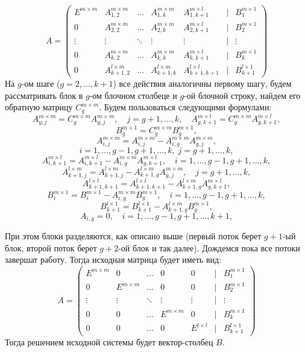 \documentclass[a4paper,12pt]{article}
\begin{document}
$$
    A=
   \begin{pmatrix}
     E^{m \times m} & A^{m \times m}_{1,2} &\ldots & A^{m \times m}_{1,k} & A^{m \times l}_{1,k+1} & \mid & B^{m \times 1}_1\\
     0 & A^{m \times m}_{2,2} &\ldots & A^{m \times m}_{2,k} & A^{m \times l}_{2,k+1} & \mid & B^{m \times 1}_2\\
     \vdots& \vdots &\ddots & \vdots & \vdots & \mid  & \vdots\\
    0 & A^{m \times m}_{k,2} &\ldots & A^{m \times m}_{k,k} & A^{m \times l}_{k,k+1} & \mid & B^{m \times 1}_k\\
     0 & A^{l \times m}_{k+1,2} & \ldots & A^{l \times m}_{k+1,k} & A^{l \times l}_{k+1,k+1} & \mid & B^{l \times 1}_{k+1}
    \end{pmatrix}
$$
На $g$-ом шаге ($g=2,\dots,k+1$) все действия аналогичны первому шагу, будем рассматривать блок в $g$-ом блочном столбеце и $g$-ой блочной строку, найдем его обратную матрицу $C^{m \times m}_g$. Будем пользоваться следующими формулами:
$$
    A^{m \times m}_{g,j} = C^{m \times m}_gA^{m \times m}_{g,j}, \quad j=g+1,\dots,k, \quad A^{m \times l}_{g, k+1} = C^{m \times m}_gA^{m \times l}_{g,k+1},
$$
$$
    B^{m \times 1}_g = C^{m \times m}_gB^{m \times 1}_g,
$$
$$
    A^{m \times m}_{i,j} = A^{m \times m}_{i,j} - A^{m \times m}_{i,g}A^{m \times m}_{g,j},
$$
$$
    i=1,\dots,g-1,g+1,\dots,k, \; j=g+1,\dots,k,
$$
$$
    A^{m \times l}_{i, k+1} = A^{m \times l}_{i, k+1} - A^{m \times m}_{i, g}A^{m \times l}_{g, k+1}, \quad i=1,\dots,g-1,g+1,\dots,k,
$$
$$
    A^{l \times m}_{k+1, j} = A^{l \times m}_{k+1, j} - A^{l \times m}_{k+1, g}A^{m \times m}_{g, j}, \quad j=g+1,\dots,k,
$$
$$
    A^{l \times l}_{k+1, k+1} = A^{l \times l}_{k+1, k+1} - A^{l \times m}_{k+1, g}A^{m \times l}_{g, k+1},
$$
$$
    B^{m \times 1}_i = B^{m \times 1}_i - A^{m \times m}_{i,g}B^{m \times 1}_g, \quad i=1,\dots,g-1,g+1,\dots,k,
$$
$$
    B^{l \times 1}_{k+1} = B^{l \times 1}_{k+1} - A^{l \times m}_{k+1, g}B^{m \times 1}_g,
$$
$$
    A_{i,g}=0, \quad i=1,\dots,g-1,g+1,\dots,k+1,
$$

При этом блоки разделяются, как описано выше (первый поток берет $g + 1$-ый блок, второй поток берет $g + 2$-ой блок и так далее). Дождемся пока все потоки завершат работу. Тогда исходная матрица будет иметь вид:
$$
    A=
   \begin{pmatrix}
     E^{m \times m} & 0 &\ldots & 0 & 0 & \mid & B^{m \times 1}_1\\
     0 & E^{m \times m} &\ldots & 0 & 0 & \mid & B^{m \times 1}_2\\
     \vdots& \vdots &\ddots & \vdots & \vdots & \mid  & \vdots\\
    0 & 0 &\ldots & E^{m \times m} & 0 & \mid & B^{m \times 1}_k\\
     0 & 0 & \ldots & 0 & E^{l \times l} & \mid & B^{l \times 1}_{k+1}
    \end{pmatrix}
$$
Тогда решением исходной системы будет вектор-столбец $B$.
\end{document}
